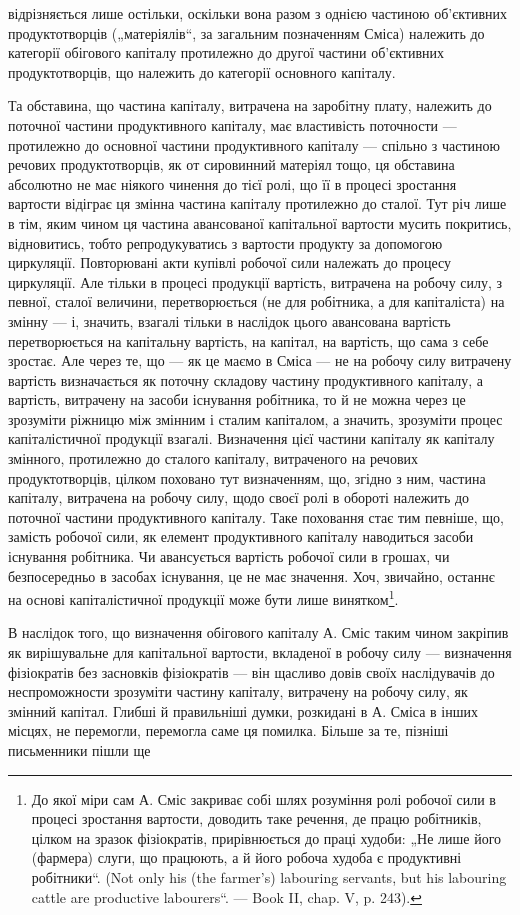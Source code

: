 відрізняється лише остільки, оскільки вона разом з однією частиною об’єктивних
продуктотворців („матеріялів“, за загальним позначенням Сміса)
належить до категорії обігового капіталу протилежно до другої частини
об’єктивних продуктотворців, що належить до категорії основного капіталу.

Та обставина, що частина капіталу, витрачена на заробітну плату, належить
до поточної частини продуктивного капіталу, має властивість поточности
— протилежно до основної частини продуктивного капіталу —
спільно з частиною речових продуктотворців, як от сировинний матеріял
тощо, ця обставина абсолютно не має ніякого чинення до тієї ролі, що
її в процесі зростання вартости відіграє ця змінна частина капіталу протилежно
до сталої. Тут річ лише в тім, яким чином ця частина авансованої
капітальної вартости мусить покритись, відновитись, тобто репродукуватись
з вартости продукту за допомогою циркуляції. Повторювані
акти купівлі робочої сили належать до процесу циркуляції. Але тільки
в процесі продукції вартість, витрачена на робочу силу, з певної, сталої
величини, перетворюється (не для робітника, а для капіталіста) на змінну —
і, значить, взагалі тільки в наслідок цього авансована вартість перетворюється
на капітальну вартість, на капітал, на вартість, що сама з себе
зростає. Але через те, що — як це маємо в Сміса — не на робочу силу
витрачену вартість визначається як поточну складову частину продуктивного
капіталу, а вартість, витрачену на засоби існування робітника, то й
не можна через це зрозуміти ріжницю між змінним і сталим капіталом, а
значить, зрозуміти процес капіталістичної продукції взагалі. Визначення
цієї частини капіталу як капіталу змінного, протилежно до сталого капіталу,
витраченого на речових продуктотворців, цілком поховано тут
визначенням, що, згідно з ним, частина капіталу, витрачена на робочу силу,
щодо своєї ролі в обороті належить до поточної частини продуктивного
капіталу. Таке поховання стає тим певніше, що, замість робочої
сили, як елемент продуктивного капіталу наводиться засоби існування
робітника. Чи авансується вартість робочої сили в грошах, чи безпосередньо
в засобах існування, це не має значення. Хоч, звичайно, останнє
на основі капіталістичної продукції може бути лише винятком\footnote{
До якої міри сам А. Сміс закриває собі шлях розуміння ролі робочої
сили в процесі зростання вартости, доводить таке речення, де працю робітників,
цілком на зразок фізіократів, прирівнюється до праці худоби: „Не лише його
(фармера) слуги, що працюють, а й його робоча худоба є продуктивні робітники“.
(Not only his (the farmer’s) labouring servants, but his labouring cattle are
productive labourers“. — Book II, chap. V, p. 243).
}.

В наслідок того, що визначення обігового капіталу А. Сміс таким
чином закріпив як вирішувальне для капітальної вартости, вкладеної в робочу
силу — визначення фізіократів без засновків фізіократів — він щасливо
довів своїх наслідувачів до неспроможности зрозуміти частину капіталу,
витрачену на робочу силу, як змінний капітал. Глибші й правильніші
думки, розкидані в А. Сміса в інших місцях, не перемогли, перемогла
саме ця помилка. Більше за те, пізніші письменники пішли ще